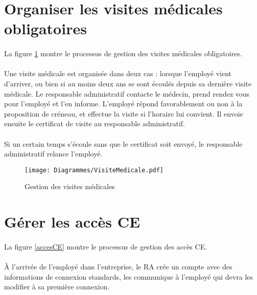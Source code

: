 \section{Organiser les visites médicales obligatoires}

\paragraph{} La figure \ref{visitesMedicales} montre le processus de gestion des visites médicales obligatoires.

\paragraph{} Une visite médicale est organisée dans deux cas : lorsque l'employé vient d'arriver, ou bien si au moins deux ans se sont écoulés depuis sa dernière visite médicale. Le responsable administratif contacte le médecin, prend rendez vous pour l'employé et l'en informe. L'employé répond favorablement ou non à la proposition de créneau, et effectue la visite si l'horaire lui convient. Il envoie ensuite le certificat de visite au responsable administratif.
\paragraph{} Si un certain temps s'écoule sans que le certificat soit envoyé, le responsable administratif relance l'employé.

\begin{figure}
	\centering
	\begin{sideways}
	\texttt{[image: Diagrammes/VisiteMedicale.pdf]}
	\end{sideways}
	\caption{Gestion des visites médicales}
	\label{visitesMedicales}	
\end{figure}

\section{Gérer les accès CE}

\paragraph{} La figure \ref{accesCE} montre le processus de gestion des accès CE.

\paragraph{} À l'arrivée de l'employé dans l'entreprise, le RA crée un compte avec des informations de connexion standards, les communique à l'employé qui devra les modifier à sa première connexion.
